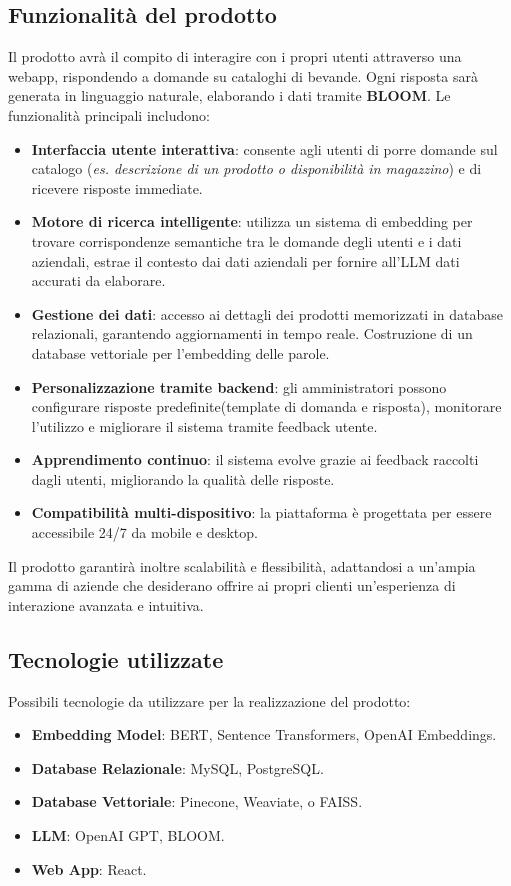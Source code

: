 \subsection{Funzionalità del prodotto}
Il prodotto avrà il compito di interagire con i propri utenti attraverso una webapp, rispondendo a domande su cataloghi di bevande. Ogni risposta sarà generata in linguaggio naturale, elaborando i dati tramite \textbf{BLOOM}. Le funzionalità principali includono:
\begin{itemize}
    \item \textbf{Interfaccia utente interattiva}: consente agli utenti di porre domande sul catalogo (\textit{es. descrizione di un prodotto o disponibilità in magazzino}) e di ricevere risposte immediate.
    \item \textbf{Motore di ricerca intelligente}: utilizza un sistema di embedding per trovare corrispondenze semantiche tra le domande degli utenti e i dati aziendali, estrae il contesto dai dati aziendali per fornire all'LLM dati accurati da elaborare.
    \item \textbf{Gestione dei dati}: accesso ai dettagli dei prodotti memorizzati in database relazionali, garantendo aggiornamenti in tempo reale. Costruzione di un database vettoriale per l'embedding delle parole.
    \item \textbf{Personalizzazione tramite backend}: gli amministratori possono configurare risposte predefinite(template di domanda e risposta), monitorare l’utilizzo e migliorare il sistema tramite feedback utente.
    \item \textbf{Apprendimento continuo}: il sistema evolve grazie ai feedback raccolti dagli utenti, migliorando la qualità delle risposte.
    \item \textbf{Compatibilità multi-dispositivo}: la piattaforma è progettata per essere accessibile 24/7 da mobile e desktop.
\end{itemize}

Il prodotto garantirà inoltre scalabilità e flessibilità, adattandosi a un’ampia gamma di aziende che desiderano offrire ai propri clienti un’esperienza di interazione avanzata e intuitiva.


\subsection{Tecnologie utilizzate} %
Possibili tecnologie da utilizzare per la realizzazione del prodotto:
\begin{itemize}
    \item \textbf{Embedding Model}: BERT, Sentence Transformers, OpenAI Embeddings.
    \item \textbf{Database Relazionale}: MySQL, PostgreSQL.
    \item \textbf{Database Vettoriale}: Pinecone, Weaviate, o FAISS.
    \item \textbf{LLM}: OpenAI GPT, BLOOM.
    \item \textbf{Web App}: React.
\end{itemize}

